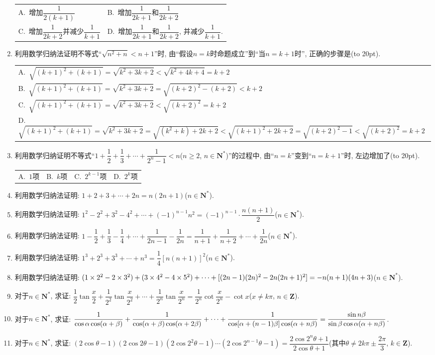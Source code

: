 \documentclass[10pt,a4paper]{article}
\newcommand{\bracket}[1]{(\hbox to #1pt{})}
\newcommand{\onech}[4]{\par\begin{tabular}{p{.9\textwidth}}
A.~#1\\
B.~#2\\
C.~#3\\
D.~#4
\end{tabular}}
\newcommand{\twoch}[4]{\par\begin{tabular}{p{.46\textwidth}p{.46\textwidth}}
A.~#1& B.~#2\\
C.~#3& D.~#4
\end{tabular}}
\newcommand{\fourch}[4]{\par\begin{tabular}{p{.23\textwidth}p{.23\textwidth}p{.23\textwidth}p{.23\textwidth}}
A.~#1 &B.~#2& C.~#3& D.~#4
\end{tabular}}
\begin{document}
\begin{enumerate}[1.]
\twoch{增加$\dfrac 1{2(k+1)}$}{增加$\dfrac 1{2k+1}$和$\dfrac 1{2k+2}$}{增加$\dfrac 1{2k+2}$并减少$\dfrac 1{k+1}$}{增加$\dfrac 1{2k+1}$和$\dfrac 1{2k+2}$, 并减少$\dfrac 1{k+1}$.}
\item 利用数学归纳法证明不等式``$\sqrt {n^2+n}<n+1$''时, 由``假设$n=k$时命题成立''到``当$n=k+1$时'', 正确的步骤是\bracket{20}.
\onech{$\sqrt {(k+1)^2+(k+1)}=\sqrt {k^2+3k+2}<\sqrt {k^2+4k+4}=k+2$}{$\sqrt {(k+1)^2+(k+1)}=\sqrt {k^2+3k+2}=\sqrt {(k+2)^2-(k+2)}<k+2$}{$\sqrt {(k+1)^2+(k+1)}=\sqrt {k^2+3k+2}<\sqrt {(k+2)^2}=k+2$}{$\sqrt {(k+1)^2+(k+1)}=\sqrt {k^2+3k+2}=\sqrt {(k^2+k)+2k+2}<\sqrt {(k+1)^2+2k+2}=\sqrt {(k+2)^2-1}<\sqrt {(k+2)^2}=k+2$}
\item 利用数学归纳证明不等式``$1+\dfrac 12+\dfrac 13+\cdots +\dfrac 1{2^n-1}<n$($n\ge 2$, $n\in \mathbf{N}^*$)''的过程中, 由``$n=k$''变到``$n=k+1$''时, 左边增加了\bracket{20}.
\fourch{$1$项}{$k$项}{$2^{k-1}$项}{$2^k$项}
\item 利用数学归纳法证明: $1+2+3+\cdots +2n=n(2n+1)$($n\in \mathbf{N}^*$).
\item 利用数学归纳法证明: $1^2-2^2+3^2-4^2+\cdots +(-1)^{n-1}n^2=(-1)^{n-1}\cdot \dfrac{n(n+1)}2$($n\in \mathbf{N}^*$).
\item 利用数学归纳法证明: $1-\dfrac 12+\dfrac 13-\dfrac 14+\cdots +\dfrac 1{2n-1}-\dfrac 1{2n}=\dfrac 1{n+1}+\dfrac 1{n+2}+\cdots +\dfrac 1{2n}$($n\in \mathbf{N}^*$).
\item 利用数学归纳法证明: $1^3+2^3+3^3+\cdots +n^3=\dfrac 14[n(n+1)]^2$($n\in \mathbf{N}^*$).
\item 利用数学归纳法证明: $(1\times 2^2-2\times 3^2)+(3\times 4^2-4\times 5^2)+\cdots +[(2n-1)(2n)^2-2n(2n+1)^2] \\ =-n(n+1)(4n+3)$($n\in \mathbf{N}^*$).
\item 对于$n\in \mathbf{N}^*$, 求证: $\dfrac 12\tan \dfrac x2+\dfrac 1{2^2}\tan \dfrac x{2^2}+\cdots +\dfrac 1{2^n}\tan \dfrac x{2^n}=\dfrac 1{2^n}\cot \dfrac x{2^n}-\cot x$($x\ne k\pi$, $n\in \mathbf{Z}$).
\item 对于$n\in \mathbf{N}^*$, 求证: $\dfrac 1{\cos \alpha \cos (\alpha +\beta)}+\dfrac 1{\cos (\alpha +\beta)\cos (\alpha +2\beta)}+\cdots +\dfrac 1{\cos [\alpha +(n-1)\beta]\cos (\alpha +n\beta)} \\ =\dfrac{\sin n\beta }{\sin \beta \cos \alpha (\alpha +n\beta)}$.
\item 对于$n\in \mathbf{N}^*$, 求证: $(2\cos \theta -1)(2\cos 2\theta -1)(2\cos 2^2\theta -1)\cdots (2\cos 2^{n-1}\theta -1)=\dfrac{2\cos {2^n}\theta +1}{2\cos \theta +1}$(其中$\theta \ne 2k\pi \pm \dfrac{2\pi }3$, $k\in \mathbf{Z}$).

\end{enumerate}
\end{document}
